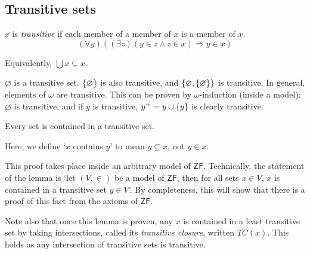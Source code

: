 \subsection{Transitive sets}
\begin{definition}
    \( x \) is \emph{transitive} if each member of a member of \( x \) is a member of \( x \).
    \[ (\forall y)((\exists z)(y \in z \wedge z \in x) \Rightarrow y \in x) \]
\end{definition}
Equivalently, \( \bigcup x \subseteq x \).
\begin{example}
    \( \varnothing \) is a transitive set.
    \( \qty{\varnothing} \) is also transitive, and \( \qty{\varnothing, \qty{\varnothing}} \) is transitive.
    In general, elements of \( \omega \) are transitive.
    This can be proven by \( \omega \)-induction (inside a model): \( \varnothing \) is transitive, and if \( y \) is transitive, \( y^+ = y \cup \qty{y} \) is clearly transitive.
\end{example}
\begin{lemma}
    Every set is contained in a transitive set.
\end{lemma}
Here, we define `\( x \) contains \( y \)' to mean \( y \subseteq x \), not \( y \in x \).
\begin{remark}
    This proof takes place inside an arbitrary model of \( \mathsf{ZF} \).
    Technically, the statement of the lemma is `let \( (V, \in) \) be a model of \( \mathsf{ZF} \), then for all sets \( x \in V \), \( x \) is contained in a transitive set \( y \in V \)'.
    By completeness, this will show that there is a proof of this fact from the axioms of \( \mathsf{ZF} \).

    Note also that once this lemma is proven, any \( x \) is contained in a least transitive set by taking intersections, called its \emph{transitive closure}, written \( TC(x) \).
    This holds as any intersection of transitive sets is transitive.
\end{remark}
